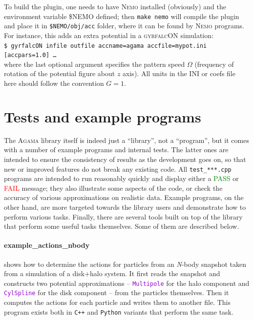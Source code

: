 \documentclass[12pt]{article}
\newcommand{\Agama}{\textsc{Agama}\xspace}
\newcommand{\Nemo} {\textsc{Nemo}\xspace}
\newcommand{\Nbody}{\textsl{N}-body\xspace}
\newcommand{\Cpp}  {\texttt{C++}\xspace}
\newcommand{\Python}{\texttt{Python}\xspace}
\newcommand{\ttt}[1]{\textcolor{darkviolet}{\texttt{#1}}}
\begin{document}
To build the plugin, one needs to have \Nemo installed (obviously) and the environment variable \$NEMO defined; then \texttt{make nemo} will compile the plugin and place it in \texttt{\$NEMO/obj/acc} folder, where it can be found by \Nemo programs. For instance, this adds an extra potential in a \textsc{gyrfalcON}  simulation:\\
\texttt{\$ gyrfalcON infile outfile accname=agama accfile=mypot.ini [accpars=1.0] \dots}\\
where the last optional argument specifies the pattern speed $\Omega$ (frequency of rotation of the potential figure about $z$ axis). All units in the INI or coefs file here should follow the convention $G=1$.


\section{Tests and example programs}  \label{sec:ExamplesTests}

The \Agama library itself is indeed just a ``library'', not a ``program'', but it comes with a number of example programs and internal tests. The latter ones are intended to ensure the consistency of results as the development goes on, so that new or improved features do not break any existing code. All \texttt{test_***.cpp} programs are intended to run reasonably quickly and display either a \textcolor{Green}{PASS} or \textcolor{Red}{FAIL} message; they also illustrate some aspects of the code, or check the accuracy of various approximations on realistic data. Example programs, on the other hand, are more targeted towards the library users and demonstrate how to perform various tasks. Finally, there are several tools built on top of the library that perform some useful tasks themselves. Some of them are described below.

\paragraph{example_actions_nbody} shows how to determine the actions for particles from an \Nbody snapshot taken from a simulation of a disk+halo system. It first reads the snapshot and constructs two potential approximations -- \ttt{Multipole} for the halo component and \ttt{CylSpline} for the disk component -- from the particles themselves. Then it computes the actions for each particle and writes them to another file. This program exists both in \Cpp and \Python variants that perform the same task.
\end{document}
